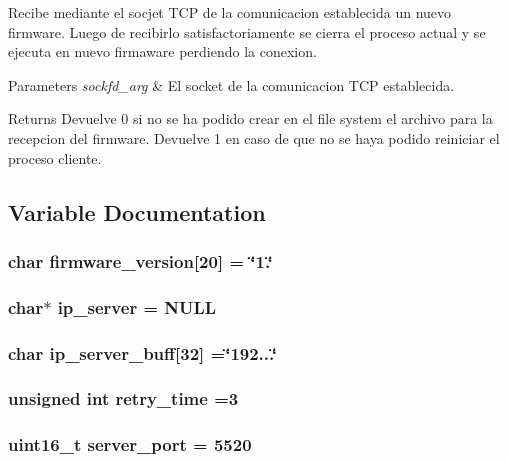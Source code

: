 Recibe mediante el socjet T\+CP de la comunicacion establecida un nuevo firmware. Luego de recibirlo satisfactoriamente se cierra el proceso actual y se ejecuta en nuevo firmaware perdiendo la conexion. 


\begin{DoxyParams}{Parameters}
{\em sockfd\+\_\+arg} & El socket de la comunicacion T\+CP establecida. \\
\hline
\end{DoxyParams}
\begin{DoxyReturn}{Returns}
Devuelve 0 si no se ha podido crear en el file system el archivo para la recepcion del firmware. Devuelve 1 en caso de que no se haya podido reiniciar el proceso cliente. 
\end{DoxyReturn}


\subsection{Variable Documentation}
\subsubsection[{firmware\+\_\+version}]{\setlength{\rightskip}{0pt plus 5cm}char firmware\+\_\+version[20] = \char`\"{}1.\char`\"{}}\label{main_8c_acc4ef5efef44f2ed8aff7cf818e27f47}
\subsubsection[{ip\+\_\+server}]{\setlength{\rightskip}{0pt plus 5cm}char$\ast$ ip\+\_\+server = N\+U\+LL}\label{main_8c_ae81b9062aeafaff4467761d2a3f51a5f}
\subsubsection[{ip\+\_\+server\+\_\+buff}]{\setlength{\rightskip}{0pt plus 5cm}char ip\+\_\+server\+\_\+buff[32] =\char`\"{}192...\char`\"{}}\label{main_8c_a2286c941e444e6765da0316b5c8c2e57}
\subsubsection[{retry\+\_\+time}]{\setlength{\rightskip}{0pt plus 5cm}unsigned int retry\+\_\+time =3}\label{main_8c_ac793c65456d6016f94774bf921d44993}
\subsubsection[{server\+\_\+port}]{\setlength{\rightskip}{0pt plus 5cm}uint16\+\_\+t server\+\_\+port = 5520}\label{main_8c_a6fb11f0475d51296a7e29f0ebb067080}
